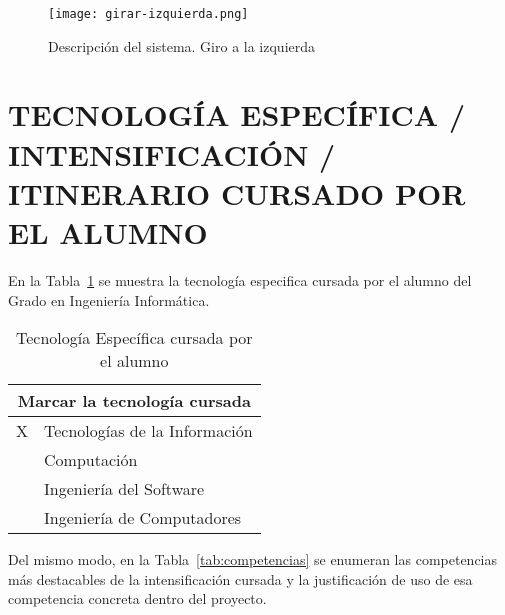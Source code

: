 \documentclass{pre-tfg}
\begin{document}
\begin{figure}[!h]
  \begin{center}
    \texttt{[image: girar-izquierda.png]}
    \caption{Descripción del sistema. Giro a la izquierda}
    \label{fig:descipcion_sistema}
  \end{center}
  \vspace{-35pt}
\end{figure}

\section{TECNOLOGÍA ESPECÍFICA / INTENSIFICACIÓN / ITINERARIO CURSADO POR EL ALUMNO}

En la Tabla~\ref{tab:tec-especifica} se muestra la tecnología especifica cursada por el alumno del Grado en Ingeniería Informática.

\begin{table}[hp]
  \centering
  \caption{Tecnología Específica cursada por el alumno}
  \label{tab:tec-especifica}

  \begin{tabular}{l p{}}
    \multicolumn{2}{c}{\textbf{Marcar la tecnología cursada}} \\
    \hline
    X & Tecnologías de la Información \\
    ~ & Computación                   \\
    ~ & Ingeniería del Software       \\
    ~ & Ingeniería de Computadores    \\ \hline
  \end{tabular}
\end{table}

Del mismo modo, en la Tabla~\ref{tab:competencias} se enumeran las competencias más destacables de la intensificación cursada y la justificación de uso de esa competencia concreta dentro del proyecto.
\end{document}
